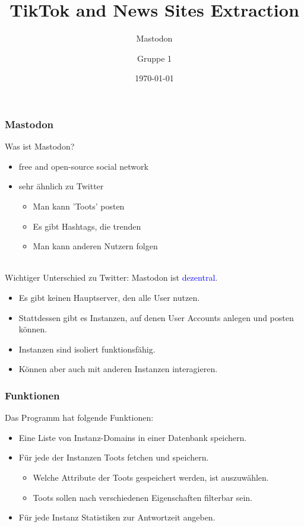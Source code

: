 \documentclass{beamer}
\title{TikTok and News Sites Extraction}
\subtitle{Mastodon}
\author{Gruppe 1}
\institute{}
\date{\today}
\newcommand{\blue}{\textcolor{blue}}
\begin{document}
\begin{frame}
    \titlepage
\end{frame}
\begin{frame}
    \frametitle{Mastodon}
    Was ist Mastodon?
    \begin{itemize}
        \item free and open-source social network
        \item sehr ähnlich zu Twitter
        \begin{itemize}
            \item Man kann 'Toots' posten
            \item Es gibt Hashtags, die trenden
            \item Man kann anderen Nutzern folgen
        \end{itemize}
    \end{itemize}
    ~\\
    Wichtiger Unterschied zu Twitter: Mastodon ist \blue{dezentral}.
    \begin{itemize}
        \item Es gibt keinen Hauptserver, den alle User nutzen.
        \item Stattdessen gibt es Instanzen, auf denen User Accounts anlegen und posten können.
        \item Instanzen sind isoliert funktionsfähig.
        \item Können aber auch mit anderen Instanzen interagieren.
    \end{itemize}
\end{frame}
\begin{frame}
    \frametitle{Funktionen}
    Das Programm hat folgende Funktionen:
    \begin{itemize}
        \item Eine Liste von Instanz-Domains in einer Datenbank speichern.
        \item Für jede der Instanzen Toots fetchen und speichern.
        \begin{itemize}
            \item Welche Attribute der Toots gespeichert werden, ist auszuwählen.
            \item Toots sollen nach verschiedenen Eigenschaften filterbar sein.
        \end{itemize}
        \item Für jede Instanz Statistiken zur Antwortzeit angeben.
    \end{itemize}
\end{frame}
\end{document}
